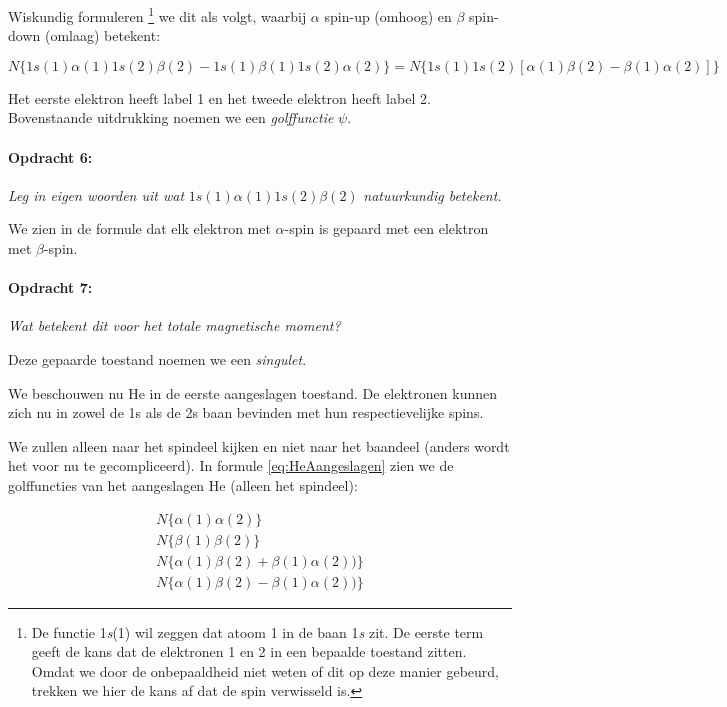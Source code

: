Wiskundig formuleren \footnote{De functie 1\emph{s}(1) wil zeggen dat
atoom 1 in de baan 1\emph{s} zit. De eerste term geeft de kans dat de
elektronen 1 en 2 in een bepaalde toestand zitten. Omdat we door de
onbepaaldheid niet weten of dit op deze manier gebeurd, trekken we hier
de kans af dat de spin verwisseld is.} we dit als volgt, waarbij
$\alpha$ spin-up (omhoog) en $\beta$ spin-down (omlaag) betekent:

\begin{equation}
N\{1s(1)\alpha(1)1s(2)\beta(2)-1s(1)\beta(1)1s(2)\alpha(2)\}
=N\{1s(1)1s(2)[\alpha(1)\beta(2)-\beta(1)\alpha(2)]\}
\end{equation}


Het eerste elektron heeft label 1 en het tweede elektron heeft label
2. Bovenstaande uitdrukking noemen we een \emph{golffunctie} $\psi$.


\paragraph*{Opdracht 6:}

\emph{Leg in eigen woorden uit wat} $1s(1)\alpha(1)1s(2)\beta(2)$
\emph{natuurkundig betekent.}

We zien in de formule dat elk elektron met $\alpha$-spin is gepaard
met een elektron met $\beta$-spin.


\paragraph*{Opdracht 7:}

\emph{Wat betekent dit voor het totale magnetische moment?}

Deze gepaarde toestand noemen we een \emph{singulet}.

We beschouwen nu He in de eerste aangeslagen toestand. De elektronen
kunnen zich nu in zowel de 1s als de 2s baan bevinden met hun respectievelijke
spins.

We zullen alleen naar het spindeel kijken en niet naar het baandeel
(anders wordt het voor nu te gecompliceerd). In formule \ref{eq:HeAangeslagen}
zien we de golffuncties van het aangeslagen He (alleen het spindeel):

\begin{equation}
\begin{array}{c}
N\{\alpha(1)\alpha(2)\}\\
N\{\beta(1)\beta(2)\}\\
N\{\alpha(1)\beta(2)+\beta(1)\alpha(2))\}\\
N\{\alpha(1)\beta(2)-\beta(1)\alpha(2))\}
\end{array}\label{eq:HeAangeslagen}
\end{equation}


